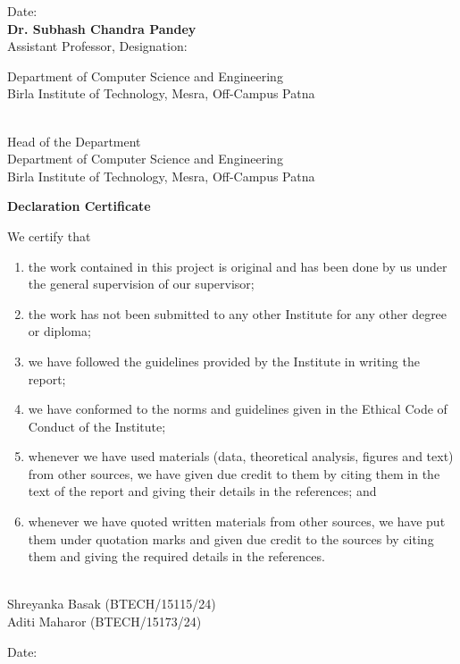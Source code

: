 \documentclass[12pt,a4paper]{report}
\begin{document}
\noindent Date: \hrulefill \hfill \hrulefill \\
\hfill \textbf{Dr. Subhash Chandra Pandey}\\
\hfill Assistant Professor, Designation: \hrulefill

\vspace{1cm}
\begin{center}
Department of Computer Science and Engineering\\
Birla Institute of Technology, Mesra, Off-Campus Patna
\end{center}
\vspace{2cm}
\begin{center}
\hrulefill\\
Head of the Department\\
Department of Computer Science and Engineering\\
Birla Institute of Technology, Mesra, Off-Campus Patna
\end{center}
\newpage

\begin{center}\bfseries\Large Declaration Certificate\end{center}
\vspace{0.5cm}
We certify that
\begin{enumerate}[label=(\alph*)]
\item the work contained in this project is original and has been done by us under the general supervision of our supervisor;
\item the work has not been submitted to any other Institute for any other degree or diploma;
\item we have followed the guidelines provided by the Institute in writing the report;
\item we have conformed to the norms and guidelines given in the Ethical Code of Conduct of the Institute;
\item whenever we have used materials (data, theoretical analysis, figures and text) from other sources, we have given due credit to them by citing them in the text of the report and giving their details in the references; and
\item whenever we have quoted written materials from other sources, we have put them under quotation marks and given due credit to the sources by citing them and giving the required details in the references.
\end{enumerate}
\vspace{2cm}
\begin{flushright}
\hrulefill\\
Shreyanka Basak (BTECH/15115/24)\\
Aditi Maharor (BTECH/15173/24)
\end{flushright}
\noindent Date: \hrulefill
\newpage
\end{document}
